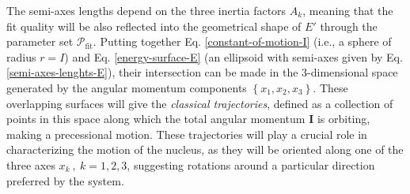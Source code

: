 The semi-axes lengths depend on the three inertia factors $A_k$, meaning that the fit quality will be also reflected into the geometrical shape of $E'$ through the parameter set $\mathcal{P}_\text{fit}$. Putting together Eq. \ref{constant-of-motion-I} (i.e., a sphere of radius $r=I$) and Eq. \ref{energy-surface-E} (an ellipsoid with semi-axes given by Eq. \ref{semi-axes-lenghts-E}), their intersection can be made in the 3-dimensional space generated by the angular momentum components $\left\{x_1,x_2,x_3\right\}$. These overlapping surfaces will give the \emph{classical trajectories}, defined as a collection of points in this space along which the total angular momentum $\mathbf{I}$ is orbiting, making a precessional motion. These trajectories will play a crucial role in characterizing the motion of the nucleus, as they will be oriented along one of the three axes $x_k\ ,\ k=1,2,3$, suggesting rotations around a particular direction preferred by the system.

